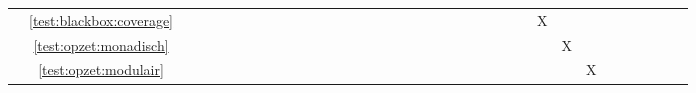 \begin{tabular}{cc|c|c|c|c|c|c|c|c|c|c|c|c|c|c|c|c|c|c|c|c|c|c|c|c|c|c|c|c|c|c|c|c|c|c|}
\multicolumn{1}{|c|}{} & \ref{test:blackbox:coverage} 									&   &   &   &   &   &   &   &   &   &   &   &   &   &   &   &   &   &   &   &   &   &   &   &   &   & X &   &     	 	 \\ \cline{2-30}
\multicolumn{1}{|c|}{} & \ref{test:opzet:monadisch} 									&   &   &   &   &   &   &   &   &   &   &   &   &   &   &   &   &   &   &   &   &   &   &   &   &   &   & X &   		 \\ \cline{2-30}
\multicolumn{1}{|c|}{} & \ref{test:opzet:modulair} 									    &   &   &   &   &   &   &   &   &   &   &   &   &   &   &   &   &   &   &   &   &   &   &   &   &   &   &   & X   	 	 \\ \cline{1-30}
\end{tabular}